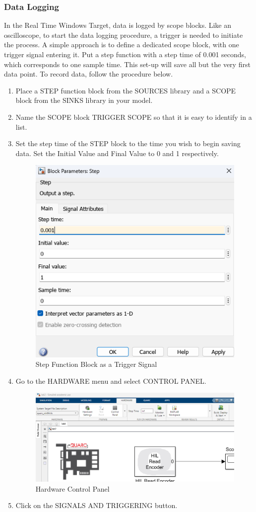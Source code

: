\documentclass[11pt,letterpaper]{article}
\begin{document}
\subsubsection{Data Logging}\label{subsubsec:data_logging}
In the Real Time Windows Target, data is logged by scope blocks. Like an oscilloscope, to start the data logging procedure, a trigger is needed to initiate the process. A simple approach is to define a dedicated scope block, with one trigger signal entering it. Put a step function with a step time of 0.001 seconds, which corresponds to one sample time. This set-up will save all but the very first data point. To record data, follow the procedure below.
\begin{enumerate}
  \item Place a STEP function block from the SOURCES library and a SCOPE block from the SINKS library in your model.
  
  \item Name the SCOPE block TRIGGER SCOPE so that it is easy to identify in a list.
  
  \item Set the step time of the STEP block to the time you wish to begin saving data. Set the Initial Value and Final Value to 0 and 1 respectively.
  \begin{figure}[H]
    \centering 
    \includegraphics[width=.7\textwidth]{Figures/fig6_stepfunc.png}
    \caption{Step Function Block as a Trigger Signal}
    \label{fig:step_trigger}
  \end{figure}
  \item Go to the HARDWARE menu and select CONTROL PANEL.
  
  \begin{figure}[H]
    \centering 
    \includegraphics[width=.65\textwidth]{Figures/fig7_ecmpanel.png}
    \caption{Hardware Control Panel}
    \label{fig:emc_panel}
  \end{figure}
  \item Click on the SIGNALS AND TRIGGERING button.
  

\end{enumerate}
\end{document}
